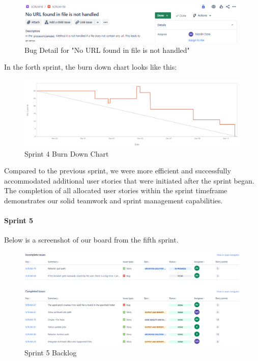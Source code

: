 \begin{figure}[h!]
    \centering
    \includegraphics[width=1\textwidth]{pictures/Scrum/Sprint 4/Bug_1}
    \caption{Bug Detail for "No URL found in file is not handled"}
    \label{fig:sprint_4_bug_1}
\end{figure}
\clearpage


In the forth sprint, the burn down chart looks like this:
\begin{figure}[h!]
    \centering
    \includegraphics[width=1\textwidth]{pictures/Scrum/Sprint 4/Sprint4_Burndownchart}
    \caption{Sprint 4 Burn Down Chart}
    \label{fig:sprint_4_bunrdown_chart}
\end{figure}

Compared to the previous sprint, we were more efficient and successfully accommodated additional user stories that were initiated after the sprint began.
The completion of all allocated user stories within the sprint timeframe demonstrates our solid teamwork and sprint management capabilities.
\clearpage


\paragraph{Sprint 5}
Below is a screenshot of our board from the fifth sprint.
\begin{figure}[h!]
    \centering
    \includegraphics[width=1\textwidth]{pictures/Scrum/Sprint 5/Sprint5_Backlog}
    \caption{Sprint 5 Backlog}
    \label{fig:sprint_5_backlog}
\end{figure}


